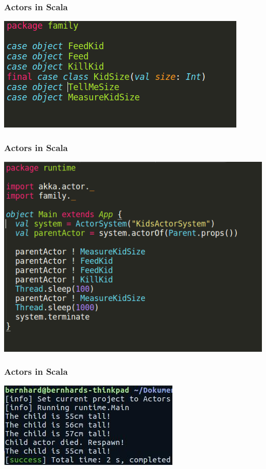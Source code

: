 \documentclass{beamer}
\begin{document}

\begin{frame}
\frametitle{Actors in Scala}
\includegraphics[width=1\linewidth]{./images/parent_messages.png}
\end{frame}


\begin{frame}
\frametitle{Actors in Scala}
\includegraphics[width=0.8\linewidth]{./images/parent_main.png}
\end{frame}


\begin{frame}
\frametitle{Actors in Scala}
\includegraphics[width=0.9\linewidth]{./images/scala_parent_terminal.jpg}
\end{frame}
\end{document}
